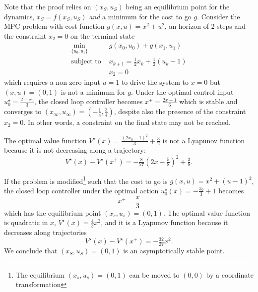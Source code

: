 \begin{example}
Note that the proof relies on $(x_S,u_S)$ being an equilibrium point for the dynamics, $x_S = f(x_S,u_S)$ \emph{and} a minimum for the cost to go $g$. Consider the MPC problem with cost function $g(x,u)=x^2+u^2$, an horizon of 2 steps and the constraint $x_2=0$ on the terminal state
\begin{equation*}
  \begin{aligned}
    \min_{\{u_0,u_1\}}\ & g(x_0, u_0) + g(x_1, u_1) \\
    \text{subject to } & x_{k+1} = \tfrac{1}{2}x_k + \tfrac{1}{2}(u_k-1) \\
                 & x_2 = 0
  \end{aligned}
\end{equation*}
which requires a non-zero input $u=1$ to drive the system to $x=0$ but $(x,u) = (0,1)$ is not a minimum for $g$. Under the optimal control input $u_0^\star = \tfrac{2-x_0}{3}$, the closed loop controller becomes $x^+ = \frac{2x-1}{6}$ which is stable and converges to $(x_\infty,u_\infty)=\left(-\tfrac{1}{4},\tfrac{3}{4}\right)$, despite also the presence of the constraint $x_2=0$. In other words, a constraint on the final state may not be reached.

The optimal value function $V^\star(x) = \tfrac{(2x_0-1)^2}{3} + \tfrac{3}{2}$ is not a Lyapunov function because it is not decreasing along a trajectory:
\begin{equation*}
  V^\star(x) - V^\star(x^+) = -\tfrac{8}{27}\left(2x-\tfrac{5}{8}\right)^2 + \tfrac{3}{8}.
\end{equation*}

If the problem is modified\footnote{The equilibrium $(x_s,u_s)=(0,1)$ can be moved to $(0,0)$ by a coordinate transformation} such that the cost to go is $g(x,u) = x^2 + (u-1)^2$, the closed loop controller under the optimal action $u_0^\star(x) = -\tfrac{x_0}{3}+1$ becomes
\begin{equation*}
  x^+ = \frac{x}{3}
\end{equation*}
which has the equilibrium point $(x_s,u_s)=(0,1)$. The optimal value function is quadratic in $x$, $V^\star(x) = \tfrac{4}{3}x^2$, and it is a Lyapunov function because it decreases along trajectories
\begin{equation*}
  V^\star(x) - V^\star(x^+) = -\tfrac{32}{27}x^2.
\end{equation*}
We conclude that $(x_S,u_S)=(0,1)$ is an asymptotically stable point.
\end{example}

